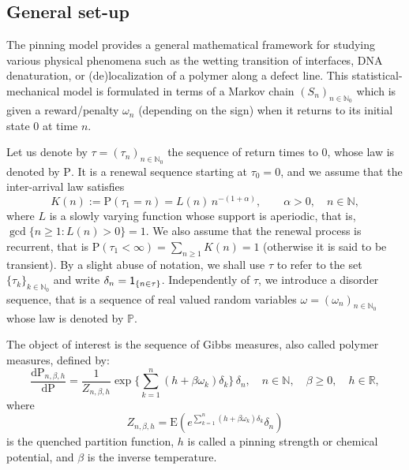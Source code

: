 \documentclass[11pt]{article}
\theoremstyle{definition}
\numberwithin{equation}{section}
\numberwithin{figure}{section}
\numberwithin{table}{section}
\newcommand{\bbN}{{\ensuremath{\mathbb N}}}
\newcommand{\bbP}{{\ensuremath{\mathbb P}}}
\newcommand{\bbR}{{\ensuremath{\mathbb R}}}
\newcommand{\ga}{\alpha}
\newcommand{\gb}{\beta}
\newcommand{\gd}{\delta}
\newcommand{\go}{\omega}
\newcommand{\dd}{\mathrm{d}}
\newcommand\bP{\ensuremath{\mathrm{P}}}
\newcommand\bE{\ensuremath{\mathrm{E}}}
\newcommand{\ind}{{\sf 1}}
\begin{document}
\subsection{General set-up}

The pinning model provides a general mathematical framework for studying various physical phenomena such as the wetting transition of interfaces, DNA denaturation, or (de)localization of a polymer along a defect line. This statistical-mechanical model is formulated in terms of a Markov chain $(S_n)_{n\in\bbN_0}$ which is given a reward/penalty $\omega_n$ (depending on the sign) when it returns to its initial state $0$ at time $n$.

Let us denote by $\tau = (\tau_n)_{n\in\bbN_0}$ the sequence of return times to $0$, whose law is denoted by $\bP$. It is a renewal sequence starting at $\tau_0 = 0$, and we assume that the inter-arrival law satisfies
\begin{equation}\label{eq:defK_regvar}
K(n) := \bP(\tau_1 = n) = L(n) \, n^{- (1 + \ga)},\qquad \ga > 0,\quad n\in\bbN,
\end{equation}
where $L$ is a slowly varying function whose support is aperiodic, that is, $\gcd\{n \geq 1 \colon L(n) > 0\}= 1$. We also assume that the renewal process is recurrent, that is $\bP(\tau_1 < \infty) = \sum_{n\ge 1} K(n) = 1$ (otherwise it is said to be transient). By a slight abuse of notation, we shall use $\tau$ to refer to the set $\{\tau_k\}_{k\in\bbN_0}$ and write $\gd_n = \ind_{\{n\in\tau\}}$. Independently of $\tau$, we introduce a disorder sequence, that is a sequence of real valued random variables $\go = (\go_n)_{n\in \bbN_0}$ whose law is denoted by $\bbP$.

The object of interest is the sequence of Gibbs measures, also called polymer measures, defined by:
\begin{equation}\label{eq:defquemeas}
\frac{\dd \bP_{n,\gb,h}}{\dd \bP} = \frac{1}{Z_{n,\gb,h}} \exp \bigg\{\sum_{k=1}^n (h + \gb \go_k)\gd_k \bigg\} \,\gd_n, \quad n \in \bbN, \quad \gb \geq 0, \quad h \in \bbR,
\end{equation}
where
\begin{equation}\label{eq:defquepf}
Z_{n,\gb,h} = \bE \left(e^{\sum_{k=1}^n (h + \gb \go_k) \gd_k} \gd_n \right)
\end{equation}
is the quenched partition function, $h$ is called a pinning strength or chemical potential, and $\gb$ is the inverse temperature.
\end{document}
